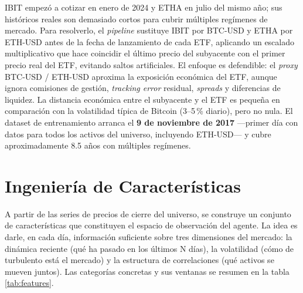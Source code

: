 \documentclass[IB,a4paper]{TFUOC}
\begin{document}
IBIT empezó a cotizar en enero de 2024 y ETHA en julio del mismo año; sus históricos reales son demasiado cortos para cubrir múltiples regímenes de mercado. Para resolverlo, el \textit{pipeline} sustituye IBIT por BTC-USD y ETHA por ETH-USD antes de la fecha de lanzamiento de cada ETF, aplicando un escalado multiplicativo que hace coincidir el último precio del subyacente con el primer precio real del ETF, evitando saltos artificiales. El enfoque es defendible: el \textit{proxy} BTC-USD / ETH-USD aproxima la exposición económica del ETF, aunque ignora comisiones de gestión, \textit{tracking error} residual, \textit{spreads} y diferencias de liquidez. La distancia económica entre el subyacente y el ETF es pequeña en comparación con la volatilidad típica de Bitcoin (3--5\,\% diario), pero no nula. El dataset de entrenamiento arranca el \textbf{9 de noviembre de 2017} —primer día con datos para todos los activos del universo, incluyendo ETH-USD— y cubre aproximadamente 8.5 años con múltiples regímenes.

\section{Ingeniería de Características}
\label{sec:features}

A partir de las series de precios de cierre del universo, se construye un conjunto de características que constituyen el espacio de observación del agente. La idea es darle, en cada día, información suficiente sobre tres dimensiones del mercado: la dinámica reciente (qué ha pasado en los últimos N días), la volatilidad (cómo de turbulento está el mercado) y la estructura de correlaciones (qué activos se mueven juntos). Las categorías concretas y sus ventanas se resumen en la tabla \ref{tab:features}.
\end{document}

